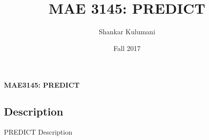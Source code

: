 \documentclass[11pt, reqno]{article}    %
\title{MAE 3145: PREDICT}
\author{Shankar Kulumani}
\date{Fall 2017}                          %
\begin{document}
\begin{center}
{\Large \textbf{MAE3145: PREDICT}}
\end{center}
\subsection*{Description}
PREDICT Description
\end{document}
